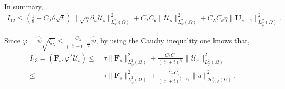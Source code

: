 \documentclass{amsart}
\numberwithin{equation}{section}
\begin{document}
In summary,
\begin{align*}
I_{12}
\leq \left(\frac{1}{8}+C_{\lambda}\theta\sqrt{t}\right)\|\sqrt{\eta}\partial_{x}\mathcal{U}_{s}\|_{L_{\varphi}^{2}(\Omega)}^{2}
    +C_{*}C_{\theta}\|\mathcal{U}_{s}\|_{L_{\varphi}^{2}(\Omega)}^{2}
    +C_{\lambda}C_{\theta}\bar{\eta}\|\mathbf{U}_{s+1}\|_{L_{\hat{\varphi}}^{2}(\Omega)}^{2}.
\end{align*}

Since $\varphi=\hat{\psi}\sqrt{\zeta_{\lambda}}\leq \frac{C_{\lambda}}{(\bar{\varsigma}+t)^{\frac{\varepsilon_{0}}{2}}}\hat{\psi}$, by using the Cauchy inequality one knows that,
\begin{align*}
I_{13}=(\mathbf{F}_{s},\varphi^{2}\mathcal{U}_{s})
\leq&~\tau\|\mathbf{F}_{s}\|_{L_{\hat{\psi}}^{2}(\Omega)}^{2}
     +\frac{C_{*}C_{\tau}}{(\bar{\varsigma}+t)^{\varepsilon_{0}}}\|\mathcal{U}_{s}\|_{L_{\varphi}^{2}(\Omega)}^{2}\\
\leq&~\tau\|\mathbf{F}_{s}\|_{L_{\hat{\psi}}^{2}(\Omega)}^{2}
     +\frac{C_{*}C_{\tau}}{(\bar{\varsigma}+t)^{\frac{1}{2}+\varepsilon_{0}}}\|u\|_{\mathcal{H}_{\psi,\varphi}^{s}(\Omega)}^{2}.
\end{align*}
\end{document}
